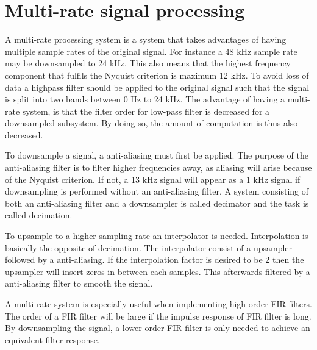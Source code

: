 \section{Multi-rate signal processing}

A multi-rate processing system is a system that takes advantages of having multiple sample rates of the original signal. For instance a 48 kHz sample rate may be downsampled to 24 kHz. This also means that the highest frequency component that fulfils the Nyquist criterion is maximum 12 kHz. To avoid loss of data a highpass filter should be applied to the original signal such that the signal is split into two bands between 0 Hz to 24 kHz. The advantage of having a multi-rate system, is that the filter order for low-pass filter is decreased for a downsampled subsystem. By doing so, the amount of computation is thus also decreased.

To downsample a signal, a anti-aliasing must first be applied. The purpose of the anti-aliasing filter is to filter higher frequencies away, as aliasing will arise because of the Nyquist criterion. If not, a 13 kHz signal will appear as a 1 kHz signal if downsampling is performed without an anti-aliasing filter. A system consisting of both an anti-aliasing filter and a downsampler is called decimator and the task is called decimation.

To upsample to a higher sampling rate an interpolator is needed. Interpolation is basically the opposite of decimation. The interpolator consist of a upsampler followed by a anti-aliasing. If the interpolation factor is desired to be 2 then the upsampler will insert zeros in-between each samples. This afterwards filtered by a anti-aliasing filter to smooth the signal. 

A multi-rate system is especially useful when implementing high order FIR-filters. The order of a FIR filter will be large if the impulse response of FIR filter is long. By downsampling the signal, a lower order FIR-filter is only needed to achieve an equivalent filter response.



